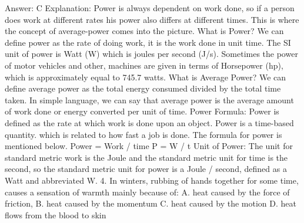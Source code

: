 Answer: C
Explanation: Power is always dependent on work done, so if a person does work at different rates his power also differs at different times. This is where the concept of average-power comes into the picture. What is Power? We can define power as the rate of doing work, it is the work done in unit time. The SI unit of power is Watt (W) which is joules per second (J/s). Sometimes the power of motor vehicles and other,  machines are given in terms of Horsepower (hp), which is approximately equal to 745.7 watts. What is Average Power? We can define average power as the total energy consumed divided by the total time taken. In simple language, we can say that average power is the average amount of work done or energy converted per unit of time. Power Formula: Power is defined as the rate at which work is done upon an object. Power is a time-based quantity. which is related to how fast a job is done. The formula for power is mentioned below. Power = Work / time P = W / t Unit of Power: The unit for standard metric work is the Joule and the standard metric unit for time is the second, so the standard metric unit for power is a Joule / second, defined as a Watt and abbreviated W. 4. In winters, rubbing of hands together for some time, causes a sensation of warmth mainly because of: A. heat caused by the force of friction,  B. heat caused by the momentum C. heat caused by the motion D. heat flows from the blood to skin 

